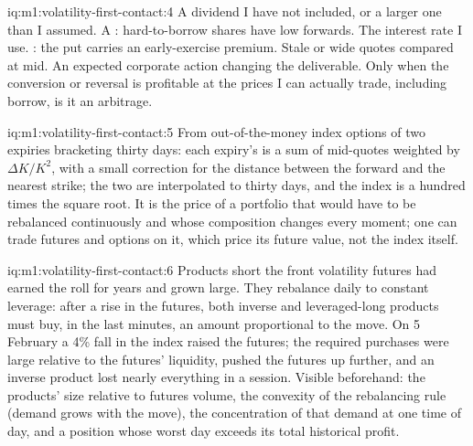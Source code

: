 \begin{solution}{iq:m1:volatility-first-contact:4}
A dividend I have not included, or a larger one than I assumed. A :
hard-to-borrow shares have low forwards. The interest rate I use. : the put carries an early-exercise premium. Stale or wide quotes
compared at mid. An expected corporate action changing the deliverable.
Only when the conversion or reversal is profitable at the prices I can
actually trade, including borrow, is it an arbitrage.
\end{solution}

\begin{solution}{iq:m1:volatility-first-contact:5}
From out-of-the-money index options of two expiries bracketing thirty days:
each expiry's  is a sum of mid-quotes weighted by $\Delta K/K^2$, with
a small correction for the distance between the forward and the nearest
strike; the two  are interpolated to thirty days, and the index is a
hundred times the square root. It is the price of a portfolio that would
have to be rebalanced continuously and whose composition changes every
moment; one can trade futures and options on it, which price its future
value, not the index itself.
\end{solution}

\begin{solution}{iq:m1:volatility-first-contact:6}
Products short the front volatility futures had earned the roll for years and
grown large. They rebalance daily to constant leverage: after a rise in the
futures, both inverse and leveraged-long products must buy, in the last
minutes, an amount proportional to the move. On 5 February a 4\% fall in the
index raised the futures; the required purchases were large relative to the
futures' liquidity, pushed the futures up further, and an inverse product
lost nearly everything in a session. Visible beforehand: the products' size
relative to futures volume, the convexity of the rebalancing rule (demand
grows with the move), the concentration of that demand at one time of day,
and a position whose worst day exceeds its total historical profit.
\end{solution}
